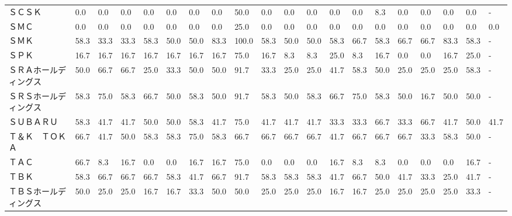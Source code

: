 \documentclass[a4paper，11pt]{jsarticle}
\begin{document}
\begin{longtable}[c]{lp{3mm}p{3mm}p{3mm}p{3mm}p{3mm}p{3mm}p{3mm}p{3mm}p{3mm}p{3mm}p{3mm}p{3mm}p{3mm}p{3mm}p{3mm}p{3mm}p{3mm}p{3mm}p{3mm}}
ＳＣＳＫ            &    0.0 &    0.0 &       0.0 &       0.0 &        0.0 &    0.0 &    0.0 &   50.0 &     0.0 &     0.0 &    0.0 &   0.0 &    0.0 &     8.3 &     0.0 &   0.0 &   0.0 &   0.0 &     - \\
ＳＭＣ             &    0.0 &    0.0 &       0.0 &       0.0 &        0.0 &    0.0 &    0.0 &   25.0 &     0.0 &     0.0 &    0.0 &   0.0 &    0.0 &     0.0 &     0.0 &   0.0 &   0.0 &   0.0 &   0.0 \\
ＳＭＫ             &   58.3 &   33.3 &      33.3 &      58.3 &       50.0 &   50.0 &   83.3 &  100.0 &    58.3 &    50.0 &   50.0 &  58.3 &   66.7 &    58.3 &    66.7 &  66.7 &  83.3 &  58.3 &     - \\
ＳＰＫ             &   16.7 &   16.7 &      16.7 &      16.7 &       16.7 &   16.7 &   16.7 &   75.0 &    16.7 &     8.3 &    8.3 &  25.0 &    8.3 &    16.7 &     0.0 &   0.0 &  16.7 &  25.0 &     - \\
ＳＲＡホールディングス     &   50.0 &   66.7 &      66.7 &      25.0 &       33.3 &   50.0 &   50.0 &   91.7 &    33.3 &    25.0 &   25.0 &  41.7 &   58.3 &    50.0 &    25.0 &  25.0 &  25.0 &  58.3 &     - \\
ＳＲＳホールディングス     &   58.3 &   75.0 &      58.3 &      66.7 &       50.0 &   58.3 &   50.0 &   91.7 &    58.3 &    50.0 &   58.3 &  66.7 &   75.0 &    58.3 &    50.0 &  16.7 &  50.0 &  50.0 &     - \\
ＳＵＢＡＲＵ          &   58.3 &   41.7 &      41.7 &      50.0 &       50.0 &   58.3 &   41.7 &   75.0 &    41.7 &    41.7 &   41.7 &  33.3 &   33.3 &    66.7 &    33.3 &  66.7 &  41.7 &  50.0 &  41.7 \\
Ｔ＆Ｋ　ＴＯＫＡ        &   66.7 &   41.7 &      50.0 &      58.3 &       58.3 &   75.0 &   58.3 &   66.7 &    66.7 &    66.7 &   66.7 &  41.7 &   66.7 &    66.7 &    66.7 &  33.3 &  58.3 &  50.0 &     - \\
ＴＡＣ             &   66.7 &    8.3 &      16.7 &       0.0 &        0.0 &   16.7 &   16.7 &   75.0 &     0.0 &     0.0 &    0.0 &  16.7 &    8.3 &     8.3 &     0.0 &   0.0 &   0.0 &  16.7 &     - \\
ＴＢＫ             &   58.3 &   66.7 &      66.7 &      66.7 &       58.3 &   41.7 &   66.7 &   91.7 &    58.3 &    58.3 &   58.3 &  41.7 &   66.7 &    50.0 &    41.7 &  33.3 &  25.0 &  41.7 &     - \\
ＴＢＳホールディングス     &   50.0 &   25.0 &      25.0 &      16.7 &       16.7 &   33.3 &   50.0 &   50.0 &    25.0 &    25.0 &   25.0 &  16.7 &   16.7 &    25.0 &    25.0 &  25.0 &  25.0 &  33.3 &     - \\

\end{longtable}
\end{document}
